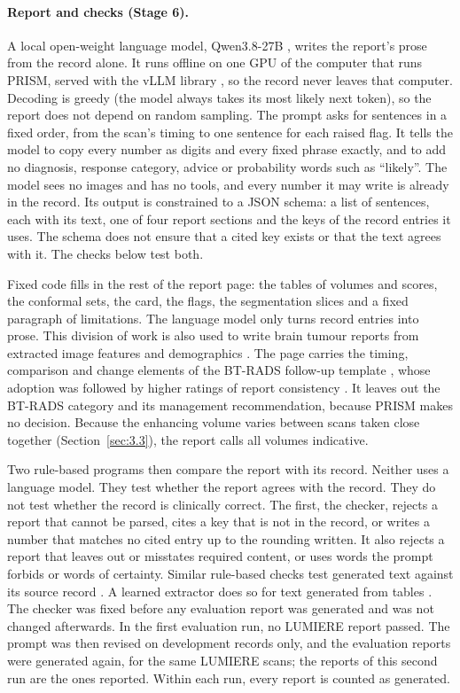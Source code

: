 \documentclass[largeformat]{interact} %
\begin{document}
\paragraph*{Report and checks (Stage 6).} A local open-weight language model, Qwen3.8-27B \citep{qwen2026}, writes the report's prose from the record alone.
It runs offline on one GPU of the computer that runs PRISM, served with the vLLM library \citep{kwon2023}, so the
record never leaves that computer. Decoding is greedy (the model always takes its most likely next token), so the report does not depend on random
sampling. The prompt asks for sentences in a fixed order, from the scan's timing to one sentence for each raised flag. It tells the model to copy every number as digits and every fixed phrase exactly, and to add no diagnosis, response
category, advice or probability words such as ``likely''. The model sees no images and has no tools, and every number
it may write is already in the record. Its output is constrained to a JSON schema: a list of sentences, each with its
text, one of four report sections and the keys of the record entries it uses. The schema does not ensure that a cited
key exists or that the text agrees with it. The checks below test both.

Fixed code fills in the rest of the report page: the tables of volumes and scores, the conformal sets, the card, the
flags, the segmentation slices and a fixed paragraph of limitations. The language model only turns record entries into
prose. This division of work is also used to write brain tumour reports from extracted image features and demographics
\citep{herasrivera2026}. The page carries the timing, comparison and change elements of the BT-RADS follow-up
template \citep{btradsweb,weinberg2018}, whose adoption was followed by higher ratings of report consistency \citep{gore2019}.
It leaves out the BT-RADS category and its management recommendation, because PRISM makes no decision. Because
the enhancing volume varies between scans taken close together (Section~\ref{sec:3.3}), the report calls all volumes
indicative.

Two rule-based programs then compare the report with its record. Neither uses a language
model. They test whether the report agrees with the record. They do not test whether the record is clinically
correct. The first, the checker, rejects a report that cannot be parsed, cites a key that is not in the record, or
writes a number that matches no cited entry up to the rounding written. It also rejects a report that leaves out or
misstates required content, or uses words the prompt forbids or words of certainty. Similar rule-based checks test generated text against its source record \citep{zeba2026}.
A learned extractor does so for text generated from tables \citep{wiseman2017}. The checker was fixed before any evaluation report was generated and was not changed afterwards. In the
first evaluation run, no LUMIERE report passed. The prompt was then revised on development records only, and the
evaluation reports were generated again, for the same LUMIERE scans; the reports of this second run are the ones
reported. Within each run, every report is counted as generated.
\end{document}
